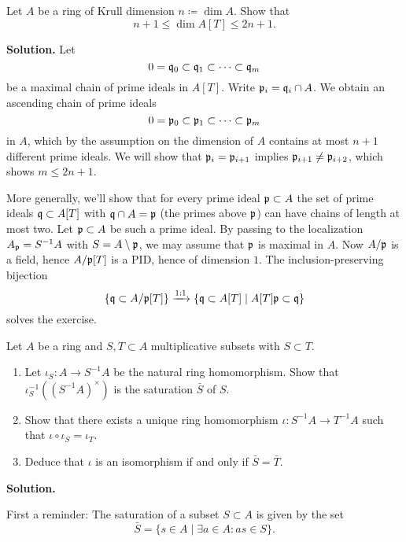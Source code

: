 \documentclass[a4paper,11pt]{article}
\begin{document}
    Let $A$ be a ring of Krull dimension $n \coloneqq \dim A$. Show that 
    \begin{equation*}
        n+1 \leq \dim A[T] \leq 2n + 1.
    \end{equation*}

\textbf{Solution.}
Let $$0 = \mathfrak{q}_0 \subset \mathfrak{q}_1 \subset \dots \subset \mathfrak{q}_m$$ be a maximal chain of 
prime ideals in $A[T]$. Write $\mathfrak{p}_i = \mathfrak{q}_i \cap A$. We obtain an ascending chain
of prime ideals 
\begin{equation*}
    0 = \mathfrak{p}_0 \subset \mathfrak{p}_1 \subset \dots \subset \mathfrak{p}_m
\end{equation*}
in $A$, which by the assumption on the dimension of $A$ contains at most $n+1$
different prime ideals. We will show that $\mathfrak{p}_i = \mathfrak{p}_{i+1}$ implies
$\mathfrak{p}_{i+1} \neq \mathfrak{p}_{i+2}$, which shows $m \leq 2n + 1$. 

More generally, we'll show that for every prime ideal $\mathfrak{p} \subset A$ the set of
prime ideals $\mathfrak{q} \subset A[T]$ with $\mathfrak{q} \cap A = \mathfrak{p}$ (the primes above
$\mathfrak{p}$) can have chains of length at most two. Let $\mathfrak{p} \subset A$ be such a prime
ideal. By passing to the localization $A_{\mathfrak{p}} = S^{-1} A$ with $S = A\setminus \mathfrak{p}$,
we may assume that $\mathfrak{p}$ is maximal in $A$. 
Now $A/\mathfrak{p}$ is a field, hence $A/\mathfrak{p}[T]$ is a PID, hence of dimension $1$. 
The inclusion-preserving bijection
\begin{equation*}
    \{\mathfrak{q} \subset A/\mathfrak{p}[T]\} \xrightarrow{1:1} \{\mathfrak{q} \subset A[T] \mid A[T]\mathfrak{p} \subset
    \mathfrak{q} \}
\end{equation*}
solves the exercise.

Let $A$ be a ring and $S, T \subset A$ multiplicative subsets with $S \subset T$. 
\begin{enumerate}
    \item Let $\iota_S : A \to S^{-1}A$ be the natural ring homomorphism. Show that 
        $\iota_S^{-1}((S^{-1} A)^\times)$ is the saturation $\bar S$ of $S$. 
    \item Show that there exists a unique ring homomorphism $\iota:  S^{-1}A \to
        T^{-1}A$ such that $\iota \circ \iota_S = \iota_T.$
    \item Deduce that $\iota$ is an isomorphism if and only if $\bar S = \bar T$. 
\end{enumerate}

\textbf{Solution.}

First a reminder: The saturation of a subset $S \subset A$ is given by the set
$$\bar S = \{s \in A \mid \exists a \in A : as \in S\}.$$
\end{document}
